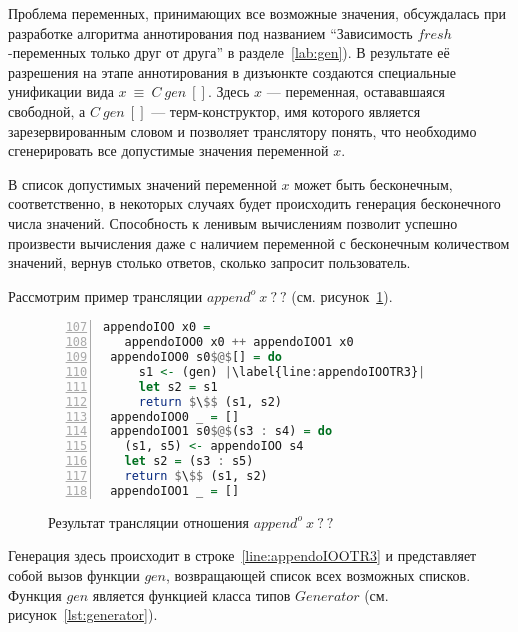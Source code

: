 Проблема переменных, принимающих все возможные значения, обсуждалась при разработке алгоритма аннотирования под названием ``Зависимость $fresh$-переменных только друг от друга'' в разделе~\ref{lab:gen}).
В результате её разрешения на этапе аннотирования в дизъюнкте создаются специальные унификации вида $x~\equiv~C~gen~[]$.
Здесь $x$ --- переменная, остававшаяся свободной, а $C~gen~[]$ --- терм-конструктор, имя которого является зарезервированным словом и позволяет транслятору понять, что необходимо сгенерировать все допустимые значения переменной $x$.

В \miniKanren{} список допустимых значений переменной $x$ может быть бесконечным, соответственно, в некоторых случаях будет происходить генерация бесконечного числа значений.
Способность \haskell{} к ленивым вычислениям позволит успешно произвести вычисления даже с наличием переменной с бесконечным количеством значений, вернув столько ответов, сколько запросит пользователь.

Рассмотрим пример трансляции $append^o \ x \ ? \ ?$ (см. рисунок~\ref{lst:appendoIOOTR}).

\begin{figure}[h!]
  \begin{center}
  \begin{minipage}{0.7\textwidth}
  \begin{lstlisting}[language=Haskell, frame=single, numbers=left,numberstyle=\small, firstnumber=107, escapechar=|]
 appendoIOO x0 =
   appendoIOO0 x0 ++ appendoIOO1 x0
 appendoIOO0 s0$@$[] = do
     s1 <- (gen) |\label{line:appendoIOOTR3}|
     let s2 = s1
     return $\$$ (s1, s2)
 appendoIOO0 _ = []
 appendoIOO1 s0$@$(s3 : s4) = do
   (s1, s5) <- appendoIOO s4
   let s2 = (s3 : s5)
   return $\$$ (s1, s2)
 appendoIOO1 _ = []
    \end{lstlisting}
  \end{minipage}
  \end{center}
  \caption{Результат трансляции отношения $append^o \ x \ ? \ ?$}
  \label{lst:appendoIOOTR}
\end{figure}

Генерация здесь происходит в строке~\ref{line:appendoIOOTR3} и представляет собой вызов функции $gen$, возвращающей список всех возможных списков.
Функция $gen$ является функцией класса типов $Generator$ (см. рисунок~\ref{lst:generator}).

